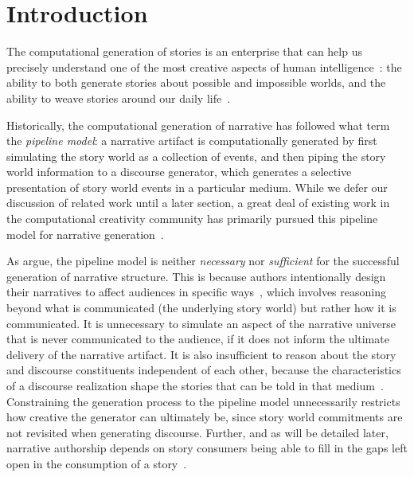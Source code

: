 \section{Introduction}

The computational generation of stories is an enterprise that can help us
precisely understand one of the most creative aspects of human
intelligence~\cite{boyd2009origin}: the ability to both generate stories about
possible and impossible worlds, and the ability to weave stories around our
daily life~\cite{herman2013storytelling}.

Historically, the computational generation of narrative has followed what
 term the \emph{pipeline model}: a narrative artifact is
computationally generated by first simulating the story world as a collection of
events, and then piping the story world information to a discourse generator, 
which generates a selective presentation of story world events in a particular 
medium. While we defer our discussion of related  work until a later section, 
a great deal of existing work in the computational creativity community has 
primarily pursued this pipeline model for narrative 
generation~\cite{gervas2009computational}. 

As \citeauthor{ronfard2014story} argue, the pipeline model is neither
\emph{necessary} nor \emph{sufficient} for the successful generation of
narrative structure. This is because authors intentionally design their
narratives to affect audiences in specific
ways~\cite{chatman1980story,bordwell1989making}, which involves reasoning beyond
what is communicated (the underlying story world) but rather how it is
communicated. It is unnecessary to simulate an aspect of the narrative universe
that is never communicated to the audience, if it does not inform the ultimate
delivery of the narrative artifact. It is also insufficient to reason
about the story and discourse constituents independent of each other, because
the characteristics of a discourse realization shape the stories that can be
told in that medium~\cite{herman2004toward}. Constraining the generation process
to the pipeline model unnecessarily restricts how creative the generator can
ultimately be, since story world commitments are not revisited when generating
discourse. Further, and as will be detailed later, narrative authorship depends
on story consumers being able to fill in the gaps left open in the
consumption of a story~\cite{saraceni2016relatedness,magliano2016filling}.

